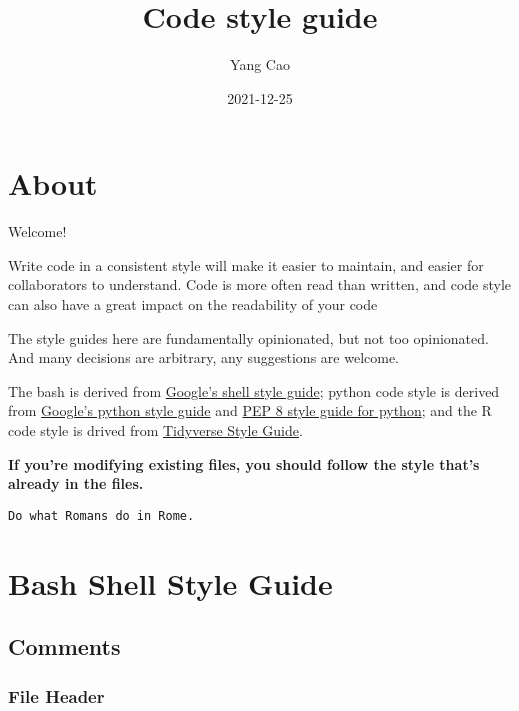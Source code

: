 \documentclass[
]{book}
\title{Code style guide}
\author{Yang Cao}
\date{2021-12-25}
\begin{document}
\maketitle

{
\setcounter{tocdepth}{1}
\tableofcontents
}
\hypertarget{about}{%
\chapter*{About}\label{about}}

Welcome!

Write code in a consistent style will make it easier to maintain, and easier
for collaborators to understand. Code is more often read than written, and code
style can also have a great impact on the readability of your code

The style guides here are fundamentally opinionated, but not too opinionated.
And many decisions are arbitrary, any suggestions are welcome.

The bash is derived from
\href{https://google.github.io/styleguide/shellguide.html}{Google's shell style guide};
python code style is derived from
\href{https://www.python.org/dev/peps/pep-0008/}{Google's python style guide} and
\href{https://www.python.org/dev/peps/pep-0008/}{PEP 8 style guide for python}; and
the R code style is drived from
\href{https://style.tidyverse.org/}{Tidyverse Style Guide}.

\textbf{If you're modifying existing files, you should follow the style that's already
in the files.}

\begin{verbatim}
Do what Romans do in Rome.
\end{verbatim}

\hypertarget{bash-shell-style-guide}{%
\chapter{Bash Shell Style Guide}\label{bash-shell-style-guide}}

\hypertarget{comments}{%
\section{Comments}\label{comments}}

\hypertarget{file-header}{%
\subsection{File Header}\label{file-header}}
\end{document}
